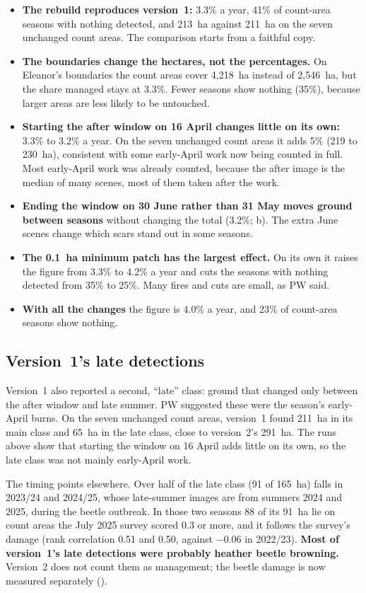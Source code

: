 \documentclass[11pt,a4paper]{article}
\begin{document}
\begin{itemize}
\item \textbf{The rebuild reproduces version~1:} 3.3\% a year, 41\% of count-area seasons with nothing detected, and 213~ha against 211~ha on the seven unchanged count areas. The comparison starts from a faithful copy.
\item \textbf{The boundaries change the hectares, not the percentages.} On Eleanor's boundaries the count areas cover 4,218~ha instead of 2,546~ha, but the share managed stays at 3.3\%. Fewer seasons show nothing (35\%), because larger areas are less likely to be untouched.
\item \textbf{Starting the after window on 16 April changes little on its own:} 3.3\% to 3.2\% a year. On the seven unchanged count areas it adds 5\% (219 to 230~ha), consistent with some early-April work now being counted in full. Most early-April work was already counted, because the after image is the median of many scenes, most of them taken after the work.
\item \textbf{Ending the window on 30 June rather than 31 May moves ground between seasons} without changing the total (3.2\%; b). The extra June scenes change which scars stand out in some seasons.
\item \textbf{The 0.1~ha minimum patch has the largest effect.} On its own it raises the figure from 3.3\% to 4.2\% a year and cuts the seasons with nothing detected from 35\% to 25\%. Many fires and cuts are small, as PW said.
\item \textbf{With all the changes} the figure is 4.0\% a year, and 23\% of count-area seasons show nothing.
\end{itemize}

\subsection{Version~1's late detections}\label{sec:late}

Version~1 also reported a second, ``late'' class: ground that changed only between the after window and late summer. PW suggested these were the season's early-April burns. On the seven unchanged count areas, version~1 found 211~ha in its main class and 65~ha in the late class, close to version~2's 291~ha. The runs above show that starting the window on 16 April adds little on its own, so the late class was not mainly early-April work.

The timing points elsewhere. Over half of the late class (91 of 165~ha) falls in 2023/24 and 2024/25, whose late-summer images are from summers 2024 and 2025, during the beetle outbreak. In those two seasons 88 of its 91~ha lie on count areas the July 2025 survey scored 0.3 or more, and it follows the survey's damage (rank correlation 0.51 and 0.50, against $-0.06$ in 2022/23). \textbf{Most of version~1's late detections were probably heather beetle browning.} Version~2 does not count them as management; the beetle damage is now measured separately ().
\end{document}
